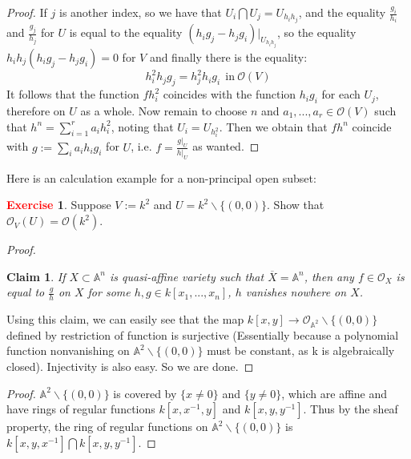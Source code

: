 \documentclass[12pt,a4paper,english]{article}
\theoremstyle{plain}
\newtheorem{claim}{Claim}
\theoremstyle{definition}
\newtheorem{exercise}{\textbf{\textcolor{red}{Exercise}}}
\theoremstyle{remark}
\begin{document}
\begin{proof}
If $j$ is another index, so we have that $U_{i}\bigcap U_{j}=U_{h_{i}h_{j}}$, and the equality $\frac{g_{i}}{h_{i}}$ and $\frac{g_{j}}{h_{j}}$ for $U$ is equal to the equality $(h_{i}g_{j}-h_{j}g_{i})|_{U_{h_{i}h_{j}}}$, so the equality $h_{i}h_{j}(h_{i}g_{j}-h_{j}g_{i})=0$ for $V$ and finally there is the equality:
\begin{equation*}
    h^{2}_{i}h_{j}g_{j}=h^{2}_{j}h_{i}g_{i}\ \ \text{in}\ \mathcal{O}(V) 
\end{equation*}
It follows that the function $fh^{2}_{i}$ coincides with the function $h_{i}g_{i}$ for each $U_{j}$, therefore on $U$ as a whole. Now remain to choose $n$ and $a_{1},...,a_{r}\in\mathcal{O}(V)$ such that $h^{n}=\sum^{r}_{i=1}a_{i}h_{i}^{2}$, noting that $U_{i}=U_{h_{i}^{2}}$. Then we obtain that $fh^{n}$ coincide with $g:=\sum_{i}a_{i}h_{i}g_{i}$ for $U$, i.e. $f=\frac{g|_{U}}{h|_{U}}$ as wanted. 
\end{proof}
Here is an calculation example for a non-principal open subset:
\begin{exercise}
Suppose $V:=k^{2}$ and $U=k^{2}\backslash \{(0,0)\}$. Show that $\mathcal{O}_{V}(U)=\mathcal{O}(k^{2})$.
\end{exercise}
\begin{tcolorbox}
\begin{proof}
\begin{claim}
If $X\subset \mathbb{A}^{n}$ is quasi-affine variety such that $\overline{X}=\mathbb{A}^{n}$, then any $f\in \mathcal{O}_{X}$ is equal to $\frac{g}{h}$ on $X$ for some $h, g\in k[x_{1},...,x_{n}]$, $h$ vanishes nowhere on $X$.      
\end{claim}

Using this claim, we can easily see that the map $k[x,y]\rightarrow \mathcal{O}_{\mathbb{A}^{2}}\backslash \{(0,0)\}$ defined by restriction of function is surjective (Essentially because a polynomial function nonvanishing on $\mathbb{A}^{2}\backslash\{(0,0)\}$ must be constant, as k is algebraically closed). Injectivity is also easy. So we are done.
\end{proof}
\begin{proof}
$\mathbb{A}^{2}\backslash\{(0,0)\}$ is covered by $\{x\not=0\}$ and $\{y\not=0\}$, which are affine and have rings of regular functions $k[x,x^{-1},y]$ and $k[x,y,y^{-1}]$. Thus by the sheaf property, the ring of regular functions on $\mathbb{A}^{2}\backslash\{(0,0)\}$ is $k[x,y,x^{-1}]\bigcap k[x,y,y^{-1}]$. 
\end{proof}
\end{tcolorbox}
\end{document}
